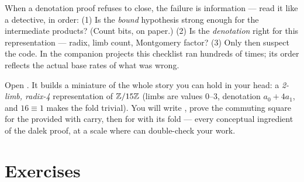 \begin{pitfall}
When a denotation proof refuses to close, the failure is information ---
read it like a detective, in order: (1) Is the \emph{bound} hypothesis
strong enough for the intermediate products? (Count bits, on paper.)
(2) Is the \emph{denotation} right for this representation --- radix, limb
count, Montgomery factor? (3) Only then suspect the code. In the companion
projects this checklist ran hundreds of times; its order reflects the actual
base rates of what was wrong.
\end{pitfall}

\begin{tryit}
Open . It builds a miniature of the whole story
you can hold in your head: a \emph{2-limb, radix-4} representation of
$\mathbb{Z}/15\mathbb{Z}$ (limbs are values $0$--$3$, denotation $a_0 + 4a_1$, and
$16 \equiv 1$ makes the fold trivial). You will write , prove
the commuting square for the provided  with carry, then for
 with its fold --- every conceptual ingredient of the dalek proof,
at a scale where  can double-check your work.
\end{tryit}

\section*{Exercises}





